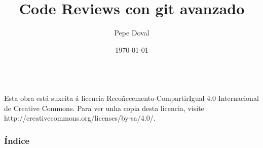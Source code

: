 \documentclass[12pt]{beamer}
\title{Code Reviews con git avanzado}
\author[Pepe Doval]{Pepe Doval}
\institute[SetPay]{SetPay}
\date{\today}
\begin{document}
\begin{frame}
  \titlepage
  \begin{tcolorbox}[]
    \centering
    {\small \bysa}\\
    {\tiny Esta obra está suxeita á licencia
      Recoñecemento-CompartirIgual 4.0 Internacional de Creative
      Commons. Para ver unha copia desta licencia, visite
      http://creativecommons.org/licenses/by-sa/4.0/.}
  \end{tcolorbox}
\end{frame}

\begin{frame}
  \frametitle{Índice}
  \tableofcontents
\end{frame}


\end{document}
